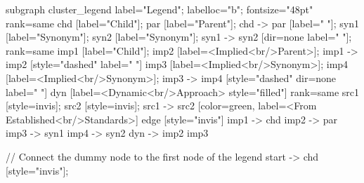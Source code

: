 \documentclass{article}
\begin{document}
{subgraph cluster_legend {
    label="Legend";
    labelloc="b";
    fontsize="48pt"
    {
        rank=same
        chd [label="Child"];
        par [label="Parent"];
        chd -> par [label="                "];
        syn1 [label="Synonym"];
        syn2 [label="Synonym"];
        syn1 -> syn2 [dir=none label="                "];
    }
    {
        rank=same
        imp1 [label="Child"];
        imp2 [label=<Implied<br/>Parent>];
        imp1 -> imp2 [style="dashed" label="                "]
        imp3 [label=<Implied<br/>Synonym>];
        imp4 [label=<Implied<br/>Synonym>];
        imp3 -> imp4 [style="dashed" dir=none label="                "]
    }
        dyn [label=<Dynamic<br/>Approach> style="filled"]
{
rank=same
src1 [style=invis];
src2 [style=invis];
src1 -> src2 [color=green, label=<From Established<br/>Standards>]
}
    edge [style="invis"]
    imp1 -> chd
    imp2 -> par
    imp3 -> syn1
    imp4 -> syn2
dyn -> { imp2 imp3 }
}

// Connect the dummy node to the first node of the legend
start -> chd [style="invis"];
}
\end{document}
